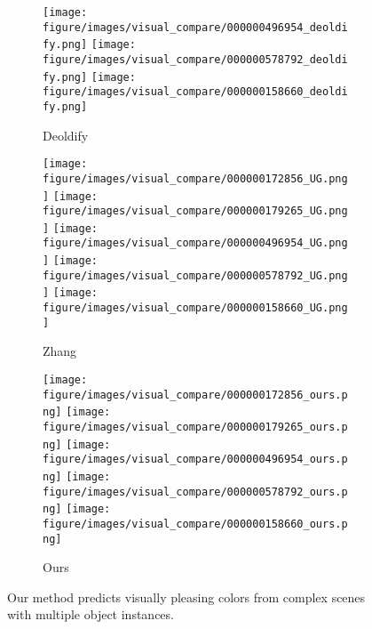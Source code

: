 \begin{figure*}[!t]
\begin{subfigure}[t]{.16\linewidth}
       \texttt{[image: figure/images/visual\_compare/000000496954\_deoldify.png]}
      \texttt{[image: figure/images/visual\_compare/000000578792\_deoldify.png]}
       \texttt{[image: figure/images/visual\_compare/000000158660\_deoldify.png]}
       \caption{Deoldify~\cite{Deoldify}}
    \end{subfigure}
    \hfill
    \begin{subfigure}[t]{.16\linewidth}
       \texttt{[image: figure/images/visual\_compare/000000172856\_UG.png]}
      \texttt{[image: figure/images/visual\_compare/000000179265\_UG.png]}
       \texttt{[image: figure/images/visual\_compare/000000496954\_UG.png]}
      \texttt{[image: figure/images/visual\_compare/000000578792\_UG.png]}
       \texttt{[image: figure/images/visual\_compare/000000158660\_UG.png]}
       \caption{Zhang~\etal~\cite{Zhang-SIGGRAPH-2017}}
    \end{subfigure}
    \hfill
    \begin{subfigure}[t]{.16\linewidth}
       \texttt{[image: figure/images/visual\_compare/000000172856\_ours.png]}
      \texttt{[image: figure/images/visual\_compare/000000179265\_ours.png]}
       \texttt{[image: figure/images/visual\_compare/000000496954\_ours.png]}
      \texttt{[image: figure/images/visual\_compare/000000578792\_ours.png]}
       \texttt{[image: figure/images/visual\_compare/000000158660\_ours.png]}
       \caption{Ours}
    \end{subfigure}
    \caption{ Our method predicts visually pleasing colors from complex scenes with multiple object instances.}
    \label{fig:comparison}
\end{figure*} 
